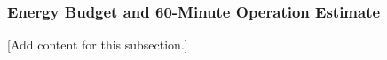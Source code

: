 
\subsubsection{Energy Budget and 60-Minute Operation Estimate}
\label{subsubsec:design_4_2_energy_budget_60min_estimate}

[Add content for this subsection.]
